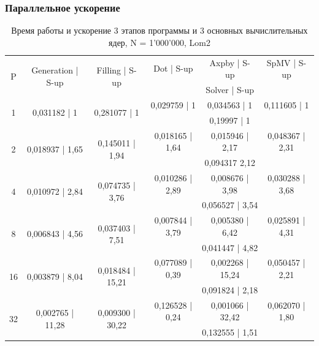 		\subsubsection{Параллельное ускорение}
		\begin{table}[H]
			\centering
			\begin{tabular}{|c||c|c|c|c|c|}
				\hline
				\multirow{2}{*}{P} &  \multirow{2}{*}{Generation | S-up} & \multirow{2}{*}{Filling | S-up} & Dot | S-up & Axpby | S-up & SpMV | S-up \\ \cline{4-6}
				                   &                              &                         & \multicolumn{3}{c|}{Solver | S-up} \\ \hline
                \multirow{2}{*}{1} & \multirow{2}{*}{0,031182 | 1} & \multirow{2}{*}{0,281077 | 1} & 0,029759 | 1 & 0,034563 | 1 & 0,111605 | 1 \\ \cline{4-6}
                                   &                   &                   & \multicolumn{3}{c|}{0,19997 | 1}   \\ \hline
                \multirow{2}{*}{2} & \multirow{2}{*}{0,018937 | 1,65} & \multirow{2}{*}{0,145011 | 1,94} & 0,018165 | 1,64 & 0,015946 | 2,17 & 0,048367 | 2,31\\ \cline{4-6}
                                   &                   &                   & \multicolumn{3}{c|}{0,094317	2,12}   \\ \hline
                \multirow{2}{*}{4} & \multirow{2}{*}{0,010972 | 2,84} & \multirow{2}{*}{0,074735 | 3,76} & 0,010286 | 2,89& 0,008676 | 3,98& 0,030288 | 3,68\\ \cline{4-6}
                                   &                   &                   & \multicolumn{3}{c|}{0,056527 | 3,54}   \\ \hline
                \multirow{2}{*}{8} & \multirow{2}{*}{0,006843 | 4,56} & \multirow{2}{*}{0,037403 | 7,51} & 0,007844 | 3,79& 0,005380 | 6,42& 0,025891 | 4,31\\ \cline{4-6}
                                   &                   &                   & \multicolumn{3}{c|}{0,041447 | 4,82}   \\ \hline
                \multirow{2}{*}{16} & \multirow{2}{*}{0,003879 | 8,04} & \multirow{2}{*}{0,018484 | 15,21} & 0,077089 | 0,39& 0,002268 | 15,24& 0,050457 | 2,21\\ \cline{4-6}
                                   &                   &                   & \multicolumn{3}{c|}{0,091824 | 2,18}   \\ \hline
                \multirow{2}{*}{32} & \multirow{2}{*}{0,002765 | 11,28} & \multirow{2}{*}{0,009300 | 30,22} & 0,126528 | 0,24& 0,001066 | 32,42& 0,062070 | 1,80\\ \cline{4-6}
                                   &                   &                   & \multicolumn{3}{c|}{0,132555 | 1,51}   \\ \hline

			\end{tabular}
			\caption{Время работы и ускорение 3 этапов программы и 3 основных вычислительных ядер, N = 1'000'000, Lom2}
			\label{par_1}
		\end{table}
